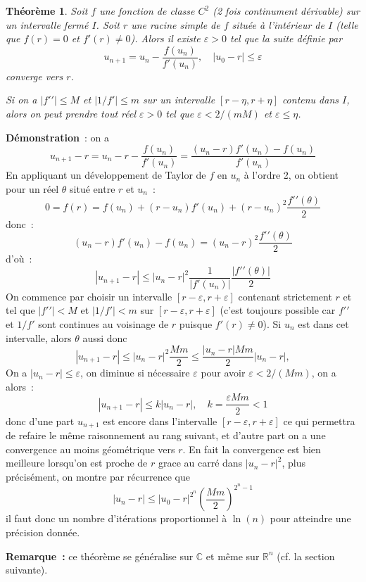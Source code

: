 \documentclass[a4paper,11pt]{book}
\newtheorem{thm}{Théorème}
\begin{document}
\begin{giacjshere}
\begin{thm} 
Soit $f$ une fonction de classe $C^2$ (2 fois continument dérivable)
sur un intervalle ferm\'e $I$. Soit $r$ une racine simple de $f$
situ\'ee \`a l'int\'erieur de $I$
(telle que $f(r)=0$ et $f'(r)\neq 0$). Alors il existe $\varepsilon>0$
tel que la suite définie par
\[ u_{n+1} = u_n -\frac{f(u_n)}{f'(u_n)}, \quad |u_0-r| \leq \varepsilon \]
converge vers $r$.

Si on a $|f'{'}| \leq M$ et $|1/f'| \leq m$ sur un intervalle 
$[r-\eta,r+\eta]$ contenu dans $I$, alors on peut prendre tout r\'eel
$\varepsilon>0$ tel que $\varepsilon < 2/(mM)$ et $\varepsilon \leq \eta$.
\end{thm}

{\bf Démonstration}~: on a
\[ u_{n+1}-r = u_n - r - \frac{f(u_n)}{f'(u_n)} = 
\frac{(u_n-r)f'(u_n)-f(u_n)}{f'(u_n)} \]
En appliquant un développement de Taylor de $f$ en $u_n$ à l'ordre 2,
on obtient pour un réel $\theta$
situé entre $r$ et $u_n$~:
\[ 0 = f(r)=f(u_n)+(r-u_n) f'(u_n) + (r-u_n)^2 \frac{f'{'}(\theta)}{2} \]
donc~:
\[ (u_n-r)f'(u_n)-f(u_n)= (u_n-r)^2 \frac{f'{'}(\theta)}{2} \]
d'o\`u~:
\[ |u_{n+1}-r| \leq |u_n-r|^2 \frac{1}{|f'(u_n)|} 
\frac{|f'{'}(\theta)|}{2} \]
On commence par choisir un intervalle $[r-\varepsilon,r+\varepsilon]$
contenant strictement $r$ et tel que $|f'{'}|<M$ et $|1/f'|<m$
sur $[r-\varepsilon,r+\varepsilon]$ (c'est toujours possible car
$f'{'}$ et $1/f'$ sont continues au voisinage de $r$ puisque $f'(r)\neq 0$).
Si $u_n$ est dans cet intervalle, alors $\theta$ aussi donc
\begin{equation}\label{eq:newton}
 |u_{n+1}-r| \leq |u_n-r|^2 \frac{Mm}{2} \leq  \frac{|u_n-r|Mm}{2}
|u_n-r|,  
\end{equation}
On a $|u_n-r| \leq \varepsilon$, on diminue si n\'ecessaire
$\varepsilon$ pour avoir $\varepsilon < 2/(Mm)$, on a alors~:
\[ |u_{n+1}-r| \leq k |u_n-r|, \quad k=\frac{\varepsilon Mm}{2}<1  \]
donc d'une part $u_{n+1}$ est encore dans l'intervalle 
$[r-\varepsilon,r+\varepsilon]$ 
ce qui permettra de refaire le m\^eme raisonnement au rang
suivant, et d'autre part
on a une convergence au moins géométrique vers $r$.
En fait la convergence est bien meilleure
lorsqu'on est proche de $r$ grace au carré dans $|u_n-r|^2$,
plus pr\'ecis\'ement, on montre par r\'ecurrence que
\[ |u_n-r| \leq |u_0 - r|^{2^n} \left( \frac{Mm}{2} \right)^{2^n-1}
\]
il faut donc un nombre d'it\'erations proportionnel \`a $\ln(n)$
pour atteindre une pr\'ecision donn\'ee.

{\bf Remarque~:} ce théorème se généralise sur $\mathbb{C}$ et même sur $\mathbb{R}^n$
(cf. la section suivante).


\end{giacjshere}
\end{document}
